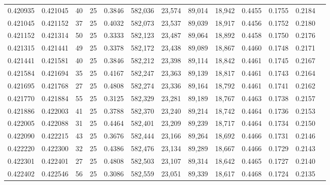 \begin{tabular}{rrrrrrrrrrrrr}
0.420935 & 0.421045 &    40 &  25 &                                     0.3846 & 582,036 &  23,574 &  89,014 &  18,942 & 0.4455 & 0.1755 & 0.2184 \\
0.421045 & 0.421152 &    37 &  25 &                                     0.4032 & 582,073 &  23,537 &  89,039 &  18,917 & 0.4456 & 0.1752 & 0.2180 \\
0.421152 & 0.421314 &    50 &  25 &                                     0.3333 & 582,123 &  23,487 &  89,064 &  18,892 & 0.4458 & 0.1750 & 0.2176 \\
0.421315 & 0.421441 &    49 &  25 &                                     0.3378 & 582,172 &  23,438 &  89,089 &  18,867 & 0.4460 & 0.1748 & 0.2171 \\
0.421441 & 0.421581 &    40 &  25 &                                     0.3846 & 582,212 &  23,398 &  89,114 &  18,842 & 0.4461 & 0.1745 & 0.2167 \\
0.421584 & 0.421694 &    35 &  25 &                                     0.4167 & 582,247 &  23,363 &  89,139 &  18,817 & 0.4461 & 0.1743 & 0.2164 \\
0.421695 & 0.421768 &    27 &  25 &                                     0.4808 & 582,274 &  23,336 &  89,164 &  18,792 & 0.4461 & 0.1741 & 0.2162 \\
0.421770 & 0.421884 &    55 &  25 &                                     0.3125 & 582,329 &  23,281 &  89,189 &  18,767 & 0.4463 & 0.1738 & 0.2157 \\
0.421886 & 0.422003 &    41 &  25 &                                     0.3788 & 582,370 &  23,240 &  89,214 &  18,742 & 0.4464 & 0.1736 & 0.2153 \\
0.422005 & 0.422088 &    31 &  25 &                                     0.4464 & 582,401 &  23,209 &  89,239 &  18,717 & 0.4464 & 0.1734 & 0.2150 \\
0.422090 & 0.422215 &    43 &  25 &                                     0.3676 & 582,444 &  23,166 &  89,264 &  18,692 & 0.4466 & 0.1731 & 0.2146 \\
0.422220 & 0.422300 &    32 &  25 &                                     0.4386 & 582,476 &  23,134 &  89,289 &  18,667 & 0.4466 & 0.1729 & 0.2143 \\
0.422301 & 0.422401 &    27 &  25 &                                     0.4808 & 582,503 &  23,107 &  89,314 &  18,642 & 0.4465 & 0.1727 & 0.2140 \\
0.422402 & 0.422546 &    56 &  25 &                                     0.3086 & 582,559 &  23,051 &  89,339 &  18,617 & 0.4468 & 0.1724 & 0.2135 \\

\end{tabular}
